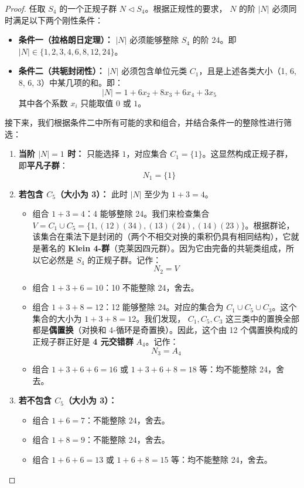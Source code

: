 \documentclass[]{article}
\begin{document}
\begin{proof}
任取 $S_4$ 的一个正规子群 $N \triangleleft S_4$。根据正规性的要求， $N$ 的阶 $|N|$ 必须同时满足以下两个刚性条件：
\begin{itemize}
	\item \textbf{条件一（拉格朗日定理）：} $|N|$ 必须能够整除 $S_4$ 的阶 24。即 $|N| \in \{1, 2, 3, 4, 6, 8, 12, 24\}$。
	\item \textbf{条件二（共轭封闭性）：} $|N|$ 必须包含单位元类 $C_1$，且是上述各类大小（1, 6, 8, 6, 3）中某几项的和。即：
	\[ |N| = 1 + 6x_2 + 8x_3 + 6x_4 + 3x_5 \]
	其中各个系数 $x_i$ 只能取值 $0$ 或 $1$。
\end{itemize}

接下来，我们根据条件二中所有可能的求和组合，并结合条件一的整除性进行筛选：

\begin{enumerate}
	\item \textbf{当阶 $|N| = 1$ 时：}
	只能选择 $1$，对应集合 $C_1 = \{1\}$。这显然构成正规子群，即\textbf{平凡子群}：
	\[ N_1 = \{1\} \]
	
	\item \textbf{若包含 $C_5$（大小为 3）：}
	此时 $|N|$ 至少为 $1 + 3 = 4$。
	\begin{itemize}
		\item 组合 $1 + 3 = 4$：4 能够整除 24。我们来检查集合 $V = C_1 \cup C_5 = \{1, (12)(34), (13)(24), (14)(23)\}$。根据群论，该集合在乘法下是封闭的（两个不相交对换的乘积仍具有相同结构），它就是著名的 \textbf{Klein 4-群}（克莱因四元群）。因为它由完备的共轭类组成，所以它必然是 $S_4$ 的正规子群。记作：
		\[ N_2 = V \]
		\item 组合 $1 + 3 + 6 = 10$：10 不能整除 24，舍去。
		\item 组合 $1 + 3 + 8 = 12$：12 能够整除 24。对应的集合为 $C_1 \cup C_5 \cup C_3$。这个集合的大小为 $1 + 3 + 8 = 12$。我们发现， $C_1, C_5, C_3$ 这三类中的置换全部都是\textbf{偶置换}（对换和 4-循环是奇置换）。因此，这个由 12 个偶置换构成的正规子群正好是 \textbf{4 元交错群} $A_4$。记作：
		\[ N_3 = A_4 \]
		\item 组合 $1 + 3 + 6 + 6 = 16$ 或 $1 + 3 + 6 + 8 = 18$ 等：均不能整除 24，舍去。
	\end{itemize}
	
	\item \textbf{若不包含 $C_5$（大小为 3）：}
	\begin{itemize}
		\item 组合 $1 + 6 = 7$：不能整除 24，舍去。
		\item 组合 $1 + 8 = 9$：不能整除 24，舍去。
		\item 组合 $1 + 6 + 6 = 13$ 或 $1 + 6 + 8 = 15$ 等：均不能整除 24，舍去。
	\end{itemize}
	

\end{enumerate}
\end{proof}
\end{document}
